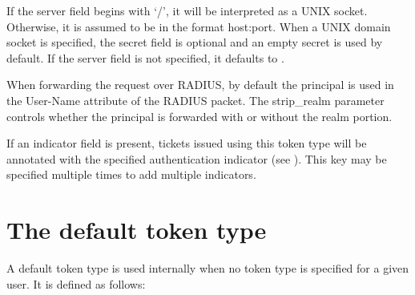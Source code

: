 \documentclass[letterpaper,10pt,english]{sphinxmanual}
\begin{document}
%
\begin{sphinxVerbatim}[commandchars=\\\{\}]
\PYG{p}{[}\PYG{p}{]}
      
               
          
             \PYG{p}{[}\PYG{p}{]}
            
            
            
\end{sphinxVerbatim}

If the server field begins with ‘/’, it will be interpreted as a UNIX
socket.  Otherwise, it is assumed to be in the format host:port.  When
a UNIX domain socket is specified, the secret field is optional and an
empty secret is used by default.  If the server field is not
specified, it defaults to {\hyperref[\detokenize{mitK5defaults:paths}]{}}.

When forwarding the request over RADIUS, by default the principal is
used in the User-Name attribute of the RADIUS packet.  The strip\_realm
parameter controls whether the principal is forwarded with or without
the realm portion.

If an indicator field is present, tickets issued using this token type
will be annotated with the specified authentication indicator (see
{\hyperref[\detokenize{admin/auth_indicator:auth-indicator}]{}}).  This key may be specified multiple times to
add multiple indicators.


\section{The default token type}
\label{\detokenize{admin/otp:the-default-token-type}}
A default token type is used internally when no token type is specified for a
given user.  It is defined as follows:
\end{document}
